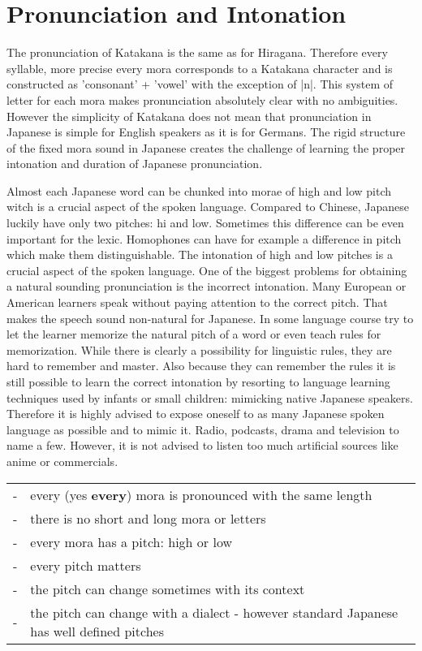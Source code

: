\section{Pronunciation and Intonation}\label{sec:PronunciationAndIntonation}

The pronunciation of Katakana is the same as for Hiragana. Therefore every
syllable, more precise every mora corresponds to a Katakana character and is
constructed as 'consonant' + 'vowel' with the exception of |n|. This system of
letter for each mora makes pronunciation absolutely clear with no ambiguities.
However the simplicity of Katakana does not mean that pronunciation in Japanese
is simple for English speakers as it is for Germans.  The rigid structure of
the fixed mora sound in Japanese creates the challenge of learning the proper
intonation and duration of Japanese pronunciation.

Almost each Japanese word can be chunked into morae of high and low pitch witch
is a crucial aspect of the spoken language. Compared to Chinese, Japanese
luckily have only two pitches: hi and low. Sometimes this difference can be
even important for the lexic. Homophones can have for example a difference in
pitch which make them distinguishable.  The intonation of high and low pitches
is a crucial aspect of the spoken language. One of the biggest problems for
obtaining a natural sounding pronunciation is the incorrect intonation. Many
European or American learners speak without paying attention to the correct
pitch. That makes the speech sound non-natural for Japanese. In some language
course try to let the learner memorize the natural pitch of a word or even
teach rules for memorization. While there is clearly a possibility for
linguistic rules, they are hard to remember and master. Also because they can
remember the rules it is still possible to learn the correct intonation by
resorting to language learning techniques used by infants or small children:
mimicking native Japanese speakers. Therefore it is highly advised to expose
oneself to as many Japanese spoken language as possible and to mimic it. Radio,
podcasts, drama and television to name a few. However, it is not advised to
listen too much artificial sources like anime or commercials.

\bigskip
\begin{tabular}{rl}
-&every (yes \textbf{every}) mora is pronounced with the same length\\
-&there is no short and long mora or letters\\
-&every mora has a pitch: high or low\\
-&every pitch matters\\
-&the pitch can change  sometimes with its context\\
-&the pitch can change with a dialect - however standard Japanese has well defined pitches\\
\end{tabular}

